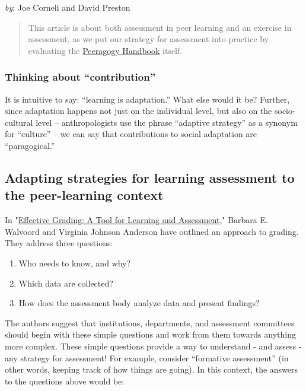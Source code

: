\emph{by}: Joe Corneli and David Preston

\begin{quote}
This article is about both assessment in peer learning and an exercise
in assessment, as we put our strategy for assessment into practice by
evaluating the \href{http://peeragogy.org}{Peeragogy Handbook} itself.
\end{quote}
\subsubsection{Thinking about ``contribution''}

It is intuitive to say: ``learning is adaptation.'' What else would it
be? Further, since adaptation happens not just on the individual level,
but also on the socio-cultural level -- anthropologists use the phrase
``adaptive strategy'' as a synonym for ``culture'' -- we can say that
contributions to social adaptation are ``paragogical.''

\subsection{Adapting strategies for learning assessment to the
peer-learning context}

In
"\href{http://books.google.com/books?id=EJxy06yX\_NoC\&printsec=frontcover\&source=gbs\_atb\#v=onepage\&q\&f=false}{Effective
Grading: A Tool for Learning and Assessment}," Barbara E. Walvoord and
Virginia Johnson Anderson have outlined an approach to grading. They
address three questions:

\begin{enumerate}
\item
  Who needs to know, and why?
\item
  Which data are collected?
\item
  How does the assessment body analyze data and present findings?
\end{enumerate}
The authors suggest that institutions, departments, and assessment
committees should begin with these simple questions and work from them
towards anything more complex. These simple questions provide a way to
understand - and assess - any strategy for assessment! For example,
consider ``formative assessment'' (in other words, keeping track of how
things are going). In this context, the answers to the questions above
would be:

